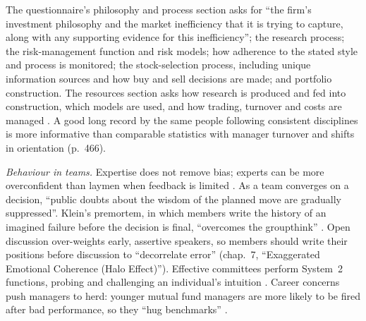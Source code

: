 \begin{qfmethod}\label{meth:manager-philosophy-process-behaviour}
 The questionnaire's philosophy and process section asks for ``the firm's investment philosophy and the market inefficiency that it is trying to capture, along with any supporting evidence for this inefficiency''; the research process; the risk-management function and risk models; how adherence to the stated style and process is monitored; the stock-selection process, including unique information sources and how buy and sell decisions are made; and portfolio construction. The resources section asks how research is produced and fed into construction, which models are used, and how trading, turnover and costs are managed \citep[chap.~7, p.~468]{managing-investment-portfolios-2007}. A good long record by the same people following consistent disciplines is more informative than comparable statistics with manager turnover and shifts in orientation (p.~466).

\emph{Behaviour in teams.} Expertise does not remove bias; experts can be more overconfident than laymen when feedback is limited \citep[NBER working paper 9222 version, p.~15]{wide-barberis-thaler-survey}. As a team converges on a decision, ``public doubts about the wisdom of the planned move are gradually suppressed''. Klein's premortem, in which members write the history of an imagined failure before the decision is final, ``overcomes the groupthink'' \citep[chap.~24, ``The Premortem'']{thinking-fast-slow-2011}. Open discussion over-weights early, assertive speakers, so members should write their positions before discussion to ``decorrelate error'' (chap.~7, ``Exaggerated Emotional Coherence (Halo Effect)''). Effective committees perform System~2 functions, probing and challenging an individual's intuition \citep[p.~6]{behavioral-finance-second-generation-2019}. Career concerns push managers to herd: younger mutual fund managers are more likely to be fired after bad performance, so they ``hug benchmarks'' \citep[chap.~15, p.~503]{s7-ang}.


\end{qfmethod}
